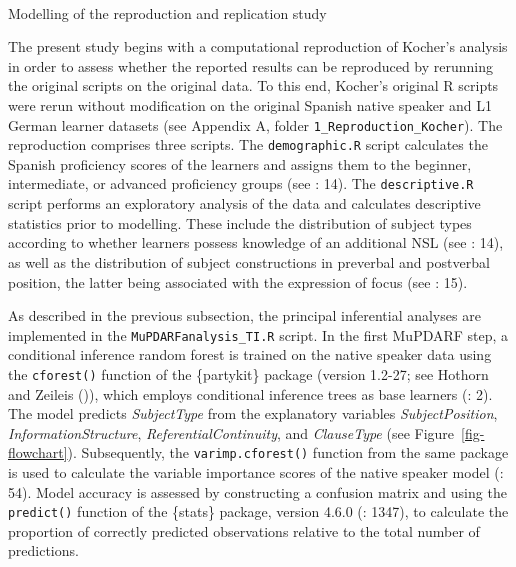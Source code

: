 \documentclass[
  letterpaper,
  DIV=11,
  numbers=noendperiod]{scrartcl}
\makeatletter
\let\oldparagraph\paragraph
\renewcommand{\paragraph}{
    \@ifstar
      \xxxParagraphStar
      \xxxParagraphNoStar
  }
\newcommand{\xxxParagraphStar}[1]{\oldparagraph*{#1}\mbox{}}
\newcommand{\xxxParagraphNoStar}[1]{\oldparagraph{#1}\mbox{}}
\makeatother
\begin{document}
\paragraph{Modelling of the reproduction and replication
study}\label{modelling-of-the-reproduction-and-replication-study}

The present study begins with a computational reproduction of Kocher's
analysis in order to assess whether the reported results can be
reproduced by rerunning the original scripts on the original data. To
this end, Kocher's original R scripts were rerun without modification on
the original Spanish native speaker and L1 German learner datasets (see
Appendix A, folder \texttt{1\_Reproduction\_Kocher}). The reproduction
comprises three scripts. The \texttt{demographic.R} script calculates
the Spanish proficiency scores of the learners and assigns them to the
beginner, intermediate, or advanced proficiency groups (see
: 14). The
\texttt{descriptive.R} script performs an exploratory analysis of the
data and calculates descriptive statistics prior to modelling. These
include the distribution of subject types according to whether learners
possess knowledge of an additional NSL (see
: 14), as well as the
distribution of subject constructions in preverbal and postverbal
position, the latter being associated with the expression of focus (see
: 15).

As described in the previous subsection, the principal inferential
analyses are implemented in the \texttt{MuPDARFanalysis\_TI.R} script.
In the first MuPDARF step, a conditional inference random forest is
trained on the native speaker data using the \texttt{cforest()} function
of the \{partykit\} package (version 1.2-27; see Hothorn and Zeileis
()), which employs conditional inference
trees as base learners (: 2). The model predicts \emph{SubjectType} from the explanatory
variables \emph{SubjectPosition}, \emph{InformationStructure},
\emph{ReferentialContinuity}, and \emph{ClauseType} (see
Figure~\ref{fig-flowchart}). Subsequently, the \texttt{varimp.cforest()}
function from the same package is used to calculate the variable
importance scores of the native speaker model
(: 54). Model accuracy
is assessed by constructing a confusion matrix and using the
\texttt{predict()} function of the \{stats\} package, version 4.6.0
(: 1347), to
calculate the proportion of correctly predicted observations relative to
the total number of predictions.
\end{document}
